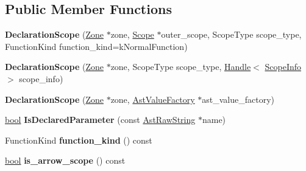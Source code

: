 \subsection*{Public Member Functions}
\begin{DoxyCompactItemize}
\item 
\mbox{\label{classv8_1_1internal_1_1DeclarationScope_a75d0883e73f5c6bec8739ca19659b879}} 
{\bfseries Declaration\+Scope} (\mbox{\hyperlink{classv8_1_1internal_1_1Zone}{Zone}} $\ast$zone, \mbox{\hyperlink{classv8_1_1internal_1_1Scope}{Scope}} $\ast$outer\+\_\+scope, Scope\+Type scope\+\_\+type, Function\+Kind function\+\_\+kind=k\+Normal\+Function)
\item 
\mbox{\label{classv8_1_1internal_1_1DeclarationScope_ab3866234b88db49c5426ea4249f39bf2}} 
{\bfseries Declaration\+Scope} (\mbox{\hyperlink{classv8_1_1internal_1_1Zone}{Zone}} $\ast$zone, Scope\+Type scope\+\_\+type, \mbox{\hyperlink{classv8_1_1internal_1_1Handle}{Handle}}$<$ \mbox{\hyperlink{classv8_1_1internal_1_1ScopeInfo}{Scope\+Info}} $>$ scope\+\_\+info)
\item 
\mbox{\label{classv8_1_1internal_1_1DeclarationScope_a95aee2b9f8162baa385511ed2a488db0}} 
{\bfseries Declaration\+Scope} (\mbox{\hyperlink{classv8_1_1internal_1_1Zone}{Zone}} $\ast$zone, \mbox{\hyperlink{classv8_1_1internal_1_1AstValueFactory}{Ast\+Value\+Factory}} $\ast$ast\+\_\+value\+\_\+factory)
\item 
\mbox{\label{classv8_1_1internal_1_1DeclarationScope_a81516fdc6c8ae2ce0a2dbc96a0b3ced0}} 
\mbox{\hyperlink{classbool}{bool}} {\bfseries Is\+Declared\+Parameter} (const \mbox{\hyperlink{classv8_1_1internal_1_1AstRawString}{Ast\+Raw\+String}} $\ast$name)
\item 
\mbox{\label{classv8_1_1internal_1_1DeclarationScope_a1777f2e2db49897ec7b111a6d3f71b40}} 
Function\+Kind {\bfseries function\+\_\+kind} () const
\item 
\mbox{\label{classv8_1_1internal_1_1DeclarationScope_a0016b9909c3db2e0eab227ef550072f2}} 
\mbox{\hyperlink{classbool}{bool}} {\bfseries is\+\_\+arrow\+\_\+scope} () const

\end{DoxyCompactItemize}
